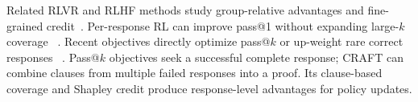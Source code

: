 Related RLVR and RLHF methods study group-relative advantages and
fine-grained credit~\citep{shao2024deepseekmath,li2026ssvpo,cao2025scar}.
Per-response RL can improve pass@1 without expanding large-\(k\) coverage
~\citep{yue2025rlcapacity,he2025unlikeliness}.  Recent objectives directly
optimize pass@\(k\) or up-weight rare correct responses
~\citep{walder2025pkpo,chen2025passktraining,he2025unlikeliness}.
Pass@\(k\) objectives seek a successful complete response; CRAFT can combine
clauses from multiple failed responses into a proof. Its clause-based coverage
and Shapley credit produce response-level advantages for policy updates.
